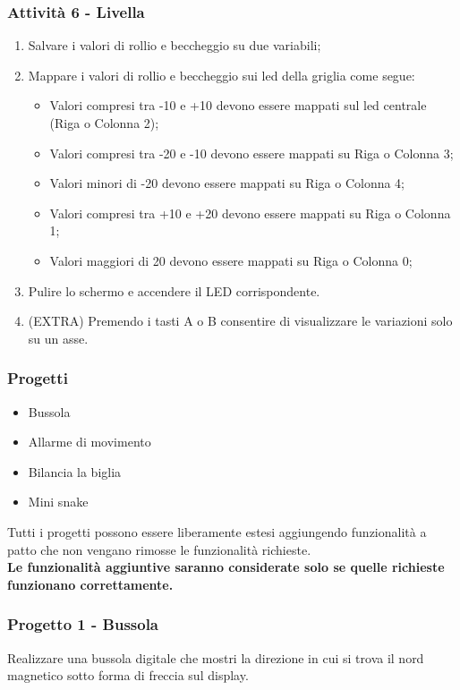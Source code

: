 \documentclass{beamer}
\begin{document}
\begin{frame}
	\frametitle{Attività 6 - Livella}

	\begin{enumerate}
		\item Salvare i valori di rollio e beccheggio su due variabili;
		\item Mappare i valori di rollio e beccheggio sui led della griglia come segue:
		\begin{itemize}
			\item Valori compresi tra -10 e +10 devono essere mappati sul led centrale (Riga o Colonna 2);
			\item Valori compresi tra -20 e -10 devono essere mappati su Riga o Colonna 3;
			\item Valori minori di -20 devono essere mappati su Riga o Colonna 4;
			\item Valori compresi tra +10 e +20 devono essere mappati su Riga o Colonna 1;
			\item Valori maggiori di 20 devono essere mappati su Riga o Colonna 0;
		\end{itemize}
		\item Pulire lo schermo e accendere il LED corrispondente.
		\item (EXTRA) Premendo i tasti A o B consentire di visualizzare le variazioni solo su un asse.
	\end{enumerate}

\end{frame}

\begin{frame}
	\frametitle{Progetti}

	\begin{itemize}
		\item Bussola
		\item Allarme di movimento
		\item Bilancia la biglia
		\item Mini snake
	\end{itemize}

	\vspace{2em}
	Tutti i progetti possono essere liberamente estesi aggiungendo funzionalità a patto che non vengano rimosse le funzionalità richieste.\\
	\textbf{Le funzionalità aggiuntive saranno considerate solo se quelle richieste funzionano correttamente.}
\end{frame}

\begin{frame}
	\frametitle{Progetto 1 - Bussola}

	Realizzare una bussola digitale che mostri la direzione in cui si trova il nord magnetico sotto forma di freccia sul display.
	
\end{frame}
\end{document}
